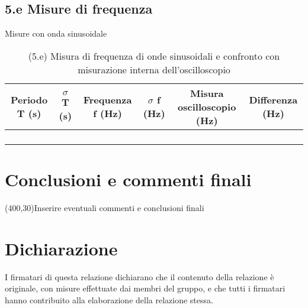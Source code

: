 \documentclass[10pt,a4paper]{article}
\newcommand{\exn}{\phantom{xxx}}
\begin{document}
\subsection*{5.e Misure di frequenza}
Misure con onda sinusoidale

\begin{table}[h]
\centering
\begin{tabular}{|c|c|c|c|c|c|}
\hline 
Periodo T (s)& $\sigma$ T (s)  &Frequenza f (Hz) & $\sigma$ f (Hz) & Misura oscilloscopio (Hz) & Differenza (Hz)\\
\hline 
\exn & \exn & \exn & \exn & \exn &\exn \\
\exn & \exn & \exn & \exn & \exn &\exn \\
\exn & \exn & \exn & \exn & \exn &\exn \\
\exn & \exn & \exn & \exn & \exn &\exn \\
\hline 
\end{tabular} 
\caption{(5.e) Misura di frequenza di onde sinusoidali  e confronto con misurazione interna dell'oscilloscopio }
\end{table}


\section{Conclusioni e commenti finali}
\framebox(400,30){Inserire eventuali commenti e conclusioni finali}

\section*{Dichiarazione}
I firmatari di questa relazione dichiarano che il contenuto della relazione \`e originale, con misure effettuate dai membri del gruppo, e che tutti i firmatari hanno contribuito alla elaborazione della relazione stessa.
\end{document}
